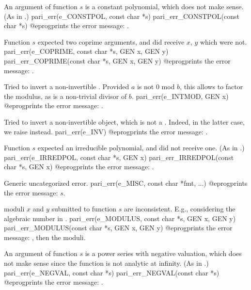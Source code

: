  An argument of function $s$ is a constant polynomial,
which does not make sense. (As in .)
\bprog
  pari_err(e_CONSTPOL, const char *s)
  pari_err_CONSTPOL(const char *s)
@eprog\noindent prints the error message: .

 Function $s$ expected two coprime arguments, and did
receive $x$, $y$ which were not.
\bprog
  pari_err(e_COPRIME, const char *s, GEN x, GEN y)
  pari_err_COPRIME(const char *s, GEN x, GEN y)
@eprog\noindent prints the error message: .

 Tried to invert a non-invertible 
. Provided $a$ is not $0$ mod $b$, this allows to factor
the modulus, as  is a non-trivial divisor of $b$.
\bprog
  pari_err(e_INTMOD, GEN x)
@eprog\noindent prints the error message: .

 Tried to invert a non-invertible object, which
is not a . Indeed, in the latter case, we raise 
instead.
\bprog
  pari_err(e_INV)
@eprog\noindent prints the error message: .

 Function $s$ expected an irreducible polynomial,
and did not receive one. (As in .)
\bprog
  pari_err(e_IRREDPOL, const char *s, GEN x)
  pari_err_IRREDPOL(const char *s, GEN x)
@eprog\noindent prints the error message: .

 Generic uncategorized error.
\bprog
  pari_err(e_MISC, const char *fmt, ...)
@eprog\noindent prints the error message: $s$.

 moduli $x$ and $y$ submitted to function $s$ are
inconsistent. E.g., considering the algebraic number
 in .
\bprog
  pari_err(e_MODULUS, const char *s, GEN x, GEN y)
  pari_err_MODULUS(const char *s, GEN x, GEN y)
@eprog\noindent prints the error message: ,
then the moduli.

 An argument of function $s$ is a power series with
negative valuation, which does not make sense since the function is not
analytic at infinity. (As in .)
\bprog
  pari_err(e_NEGVAL, const char *s)
  pari_err_NEGVAL(const char *s)
@eprog\noindent prints the error message: .

